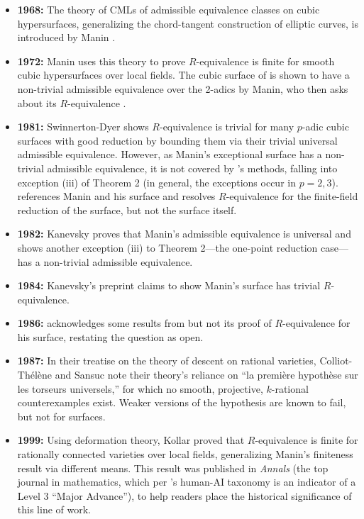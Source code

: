 \documentclass[11pt]{article}
\theoremstyle{definition}
\begin{document}
\begin{itemize}
  \item \textbf{1968:} The theory of CMLs of admissible equivalence classes on cubic hypersurfaces, generalizing the chord-tangent construction of elliptic curves, is introduced by Manin \cite{manin1968cubic}.
  \item \textbf{1972:} Manin uses this theory to prove $R$-equivalence is finite for smooth cubic hypersurfaces over local fields. The cubic surface of  is shown to have a non-trivial admissible equivalence over the 2-adics by Manin, who then asks about its $R$-equivalence \cite[\S II.6]{manin3firstedition}.
  \item \textbf{1981:} Swinnerton-Dyer \cite{swinnertondyer} shows $R$-equivalence is trivial for many $p$-adic cubic surfaces with good reduction by bounding them via their trivial universal admissible equivalence. However, as Manin's exceptional surface has a non-trivial admissible equivalence, it is not covered by \cite{swinnertondyer}'s methods, falling into exception (iii) of Theorem 2 (in general, the exceptions occur in $p=2, 3$). \cite[\S 8]{swinnertondyer} references Manin and his surface and resolves $R$-equivalence for the finite-field reduction of the surface, but not the surface itself.
  \item \textbf{1982:} Kanevsky \cite{dimitrikanevsky} proves that Manin's admissible equivalence is universal and shows another exception (iii) to Theorem 2---the one-point reduction case---has a non-trivial admissible equivalence.
  \item \textbf{1984:} Kanevsky's preprint \cite{dkbrauer} claims to show Manin's surface has trivial $R$-equivalence.
  \item \textbf{1986:} \cite{manin3} acknowledges some results from \cite{dkbrauer} but not its proof of $R$-equivalence for his surface, restating the question as open.
  \item \textbf{1987:} In their treatise \cite{colliot1987descente} on the theory of descent on rational varieties, Colliot-Th\'{e}l\`{e}ne and Sansuc note their theory's reliance on ``la premi\`{e}re hypoth\`{e}se sur les torseurs universels,'' for which no smooth, projective, $k$-rational counterexamples exist. Weaker versions of the hypothesis are known to fail, but not for surfaces.
  \item \textbf{1999:} Using deformation theory, Kollar \cite{kollar1999rationally} proved that $R$-equivalence is finite for rationally connected varieties over local fields, generalizing Manin's finiteness result via different means. This result was published in \textit{Annals} (the top journal in mathematics, which per \cite{feng2026aletheia}'s human-AI taxonomy is an indicator of a Level 3 ``Major Advance''), to help readers place the historical significance of this line of work.

\end{itemize}
\end{document}
